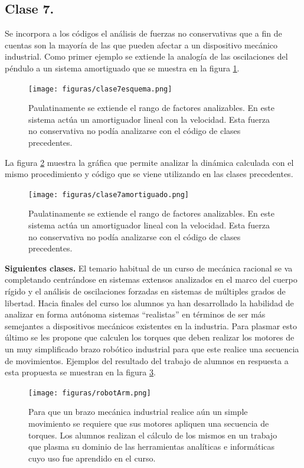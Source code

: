 \subsection{Clase 7.} Se incorpora a los códigos el análisis de fuerzas no conservativas que a fin de cuentas son la mayoría de las que pueden afectar a un dispositivo mecánico industrial. Como primer ejemplo se extiende la analogía de las oscilaciones del péndulo a un sistema amortiguado que se muestra en la figura \ref{fig:clase7esquema}.

\begin{figure}[!ht]
\centering
\texttt{[image: figuras/clase7esquema.png]}
\caption{Paulatinamente se extiende el rango de factores analizables. En este sistema actúa un amortiguador lineal con la velocidad. Esta fuerza no conservativa no podía analizarse con el código de clases precedentes.}
\label{fig:clase7esquema}
\end{figure}

La figura \ref{fig:clase7amo} muestra la gráfica que permite analizar la dinámica calculada con el mismo procedimiento y código que se viene utilizando en las clases precedentes.

\begin{figure}[!ht]
\centering
\texttt{[image: figuras/clase7amortiguado.png]}
\caption{Paulatinamente se extiende el rango de factores analizables. En este sistema actúa un amortiguador lineal con la velocidad. Esta fuerza no conservativa no podía analizarse con el código de clases precedentes.}
\label{fig:clase7amo}
\end{figure}

\textbf{Siguientes clases.} El temario habitual de un curso de mecánica racional se va completando centrándose en sistemas extensos analizados en el marco del cuerpo rígido y el análisis de oscilaciones forzadas en sistemas de múltiples grados de libertad. Hacia finales del curso los alumnos ya han desarrollado la habilidad de analizar en forma autónoma sistemas “realistas” en términos de ser más semejantes a dispositivos mecánicos existentes en la industria. Para plasmar esto último se les propone que calculen los torques que deben realizar los motores de un muy simplificado brazo robótico industrial para que este realice una secuencia de movimientos. Ejemplos del resultado del trabajo de alumnos en respuesta a esta propuesta se muestran en la figura \ref{fig:robotarm}.

\begin{figure}[!ht]
\centering
\texttt{[image: figuras/robotArm.png]}
\caption{Para que un brazo mecánica industrial  realice aún un simple movimiento se requiere que sus motores apliquen una secuencia de torques. Los alumnos realizan el cálculo de los mismos en un trabajo que plasma su dominio de las herramientas analíticas e informáticas cuyo uso fue aprendido en el curso.}
\label{fig:robotarm}
\end{figure}